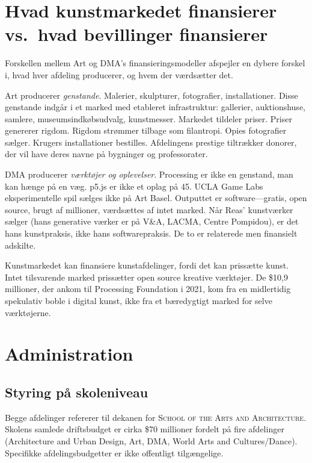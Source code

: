 \documentclass[10pt,letterpaper,twocolumn]{article}
\newcommand{\dma}{\textsc{DMA}}
\newcommand{\sofa}{\textsc{School of the Arts and Architecture}}
\begin{document}
\section{Hvad kunstmarkedet finansierer vs.\ hvad bevillinger finansierer}

Forskellen mellem Art og \dma{}'s finansieringsmodeller afspejler en dybere forskel i, hvad hver afdeling producerer, og hvem der værdsætter det.

Art producerer \emph{genstande}. Malerier, skulpturer, fotografier, installationer. Disse genstande indgår i et marked med etableret infrastruktur: gallerier, auktionshuse, samlere, museumsindkøbsudvalg, kunstmesser. Markedet tildeler priser. Priser genererer rigdom. Rigdom strømmer tilbage som filantropi. Opies fotografier sælger. Krugers installationer bestilles. Afdelingens prestige tiltrækker donorer, der vil have deres navne på bygninger og professorater.

\dma{} producerer \emph{værktøjer og oplevelser}. Processing er ikke en genstand, man kan hænge på en væg. p5.js er ikke et oplag på 45. UCLA Game Labs eksperimentelle spil sælges ikke på Art Basel. Outputtet er software---gratis, open source, brugt af millioner, værdsættes af intet marked. Når Reas' kunstværker sælger (hans generative værker er på V\&A, LACMA, Centre Pompidou), er det hans kunstpraksis, ikke hans softwarepraksis. De to er relaterede men finansielt adskilte.

Kunstmarkedet kan finansiere kunstafdelinger, fordi det kan prissætte kunst. Intet tilsvarende marked prissætter open source kreative værktøjer. De \$10,9 millioner, der ankom til Processing Foundation i 2021, kom fra en midlertidig spekulativ boble i digital kunst, ikke fra et bæredygtigt marked for selve værktøjerne.

\section{Administration}

\subsection{Styring på skoleniveau}

Begge afdelinger refererer til dekanen for \sofa{}. Skolens samlede driftsbudget er cirka \$70 millioner fordelt på fire afdelinger (Architecture and Urban Design, Art, \dma{}, World Arts and Cultures/Dance). Specifikke afdelingsbudgetter er ikke offentligt tilgængelige.
\end{document}
